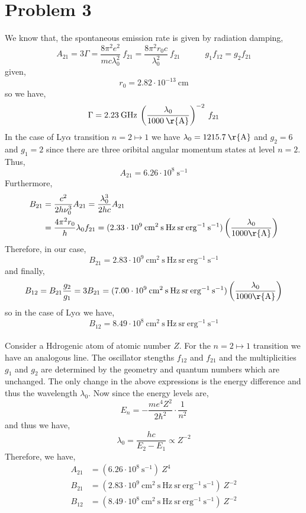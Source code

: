 \documentclass[12pt]{article}
\begin{document}
\section{Problem 3}

We know that, the spontaneous emission rate is given by radiation damping,
\[ A_{21} = 3 \Gamma = \frac{8 \pi^2 e^2}{m c \lambda_0^2} \: f_{21} =  \frac{8 \pi^2 r_0 c}{\lambda_0^2} \: f_{21} \quad \quad \quad g_1 f_{12} = g_2 f_{21} \]
given,
\[ r_0 = 2.82 \cdot 10^{-13} \: \mathrm{cm} \]
so we have,
\[ \Gamma = 2.23 \: \mathrm{GHz} \: \left( \frac{\lambda_0}{1000 \: \mathrm{\r{A}} } \right)^{-2} \: f_{21} \]
In the case of Ly$\alpha$ transition $n = 2 \mapsto 1$ we have $\lambda_0 = 1215.7 \: \mathrm{\r{A}}$ and $g_2 = 6$ and $g_1 = 2$ since there are three oribital angular momentum states at level $n = 2$. Thus,
\[ A_{21} = 6.26 \cdot 10^8 \: \mathrm{s}^{-1} \]
Furthermore,
\begin{align*}
B_{21} & = \frac{c^2}{2 h \nu_0^3} A_{21} = \frac{\lambda_0^3}{2 h c} A_{21}
\\
& = \frac{4 \pi^2 r_0}{h} \lambda_0 f_{21} = (2.33 \cdot 10^9 \: \mathrm{cm}^2 \: \mathrm{s} \: \mathrm{Hz} \: \mathrm{sr} \: \mathrm{erg}^{-1} \: \mathrm{s}^{-1}) \left( \frac{\lambda_0}{1000 \mathrm{\r{A}}} \right) 
\end{align*}
Therefore, in our case,
\[ B_{21} = 2.83 \cdot 10^9 \: \mathrm{cm}^2 \: \mathrm{s} \: \mathrm{Hz} \: \mathrm{sr} \: \mathrm{erg}^{-1} \: \mathrm{s}^{-1} \]
and finally,
\[ B_{12} = B_{21} \frac{g_2}{g_1} = 3 B_{21} = (7.00 \cdot 10^9 \: \mathrm{cm}^2 \: \mathrm{s} \: \mathrm{Hz} \: \mathrm{sr} \: \mathrm{erg}^{-1} \: \mathrm{s}^{-1}) \left( \frac{\lambda_0}{1000 \mathrm{\r{A}}} \right)  \]
so in the case of Ly$\alpha$ we have,
\[ B_{12} = 8.49 \cdot 10^8 \: \mathrm{cm}^2 \: \mathrm{s} \: \mathrm{Hz} \: \mathrm{sr} \: \mathrm{erg}^{-1} \: \mathrm{s}^{-1}  \]
\bigskip\\
Consider a Hdrogenic atom of atomic number $Z$. For the $n = 2 \mapsto 1$ transition we have an analogous line. The oscillator stengths $f_{12}$ and $f_{21}$ and the multiplicities $g_1$ and $g_2$ are determined by the geometry and quantum numbers which are unchanged. The only change in the above expressions is the energy difference and thus the wavelength $\lambda_0$. Now since the energy levels are,
\[ E_n = - \frac{m e^4 Z^2}{2 \hbar^2} \cdot \frac{1}{n^2} \] 
and thus we have,
\[ \lambda_0 = \frac{h c}{E_2 - E_1} \propto Z^{-2} \]
Therefore, we have,
\begin{align*}
A_{21} & = (6.26 \cdot 10^8 \: \mathrm{s}^{-1}) \: Z^{4}
\\
B_{21} & = (2.83 \cdot 10^9 \: \mathrm{cm}^2 \: \mathrm{s} \: \mathrm{Hz} \: \mathrm{sr} \: \mathrm{erg}^{-1} \: \mathrm{s}^{-1}) \: Z^{-2}
\\
B_{12} & = (8.49 \cdot 10^8 \: \mathrm{cm}^2 \: \mathrm{s} \: \mathrm{Hz} \: \mathrm{sr} \: \mathrm{erg}^{-1} \: \mathrm{s}^{-1}) \: Z^{-2}
\end{align*}
\end{document}
